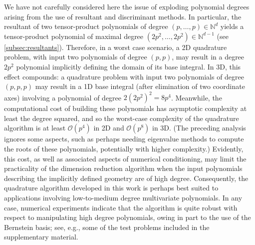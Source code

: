 \documentclass[onefignum,onetabnum,onealgnum,oneeqnum]{siamart190516}
\begin{document}
We have not carefully considered here the issue of exploding polynomial degrees arising from the use of resultant and discriminant methods. In particular, the resultant of two tensor-product polynomials of degree $(p,\ldots,p) \in \mathbb N^d$ yields a tensor-product polynomial of maximal degree $(2p^2, \ldots, 2p^2) \in \mathbb N^{d-1}$ (see \cref{subsec:resultants}). Therefore, in a worst case scenario, a 2D quadrature problem, with input two polynomials of degree $(p,p)$, may result in a degree $2p^2$ polynomial implicitly defining the domain of its base integral. In 3D, this effect compounds: a quadrature problem with input two polynomials of degree $(p,p,p)$ may result in a 1D base integral (after elimination of two coordinate axes) involving a polynomial of degree $2 (2 p^2)^2 = 8 p^4$. Meanwhile, the computational cost of building these polynomials has asymptotic complexity at least the degree squared, and so the worst-case complexity of the quadrature algorithm is at least $\mathcal O (p^4)$ in 2D and $\mathcal O(p^8)$ in 3D. (The preceding analysis ignores some aspects, such as perhaps needing eigenvalue methods to compute the roots of these polynomials, potentially with higher complexity.) Evidently, this cost, as well as associated aspects of numerical conditioning, may limit the practicality of the dimension reduction algorithm when the input polynomials describing the implicitly defined geometry are of high degree. Consequently, the quadrature algorithm developed in this work is perhaps best suited to applications involving low-to-medium degree multivariate polynomials. In any case, numerical experiments indicate that the algorithm is quite robust with respect to manipulating high degree polynomials, owing in part to the use of the Bernstein basis; see, e.g., some of the test problems included in the supplementary material.
\end{document}
